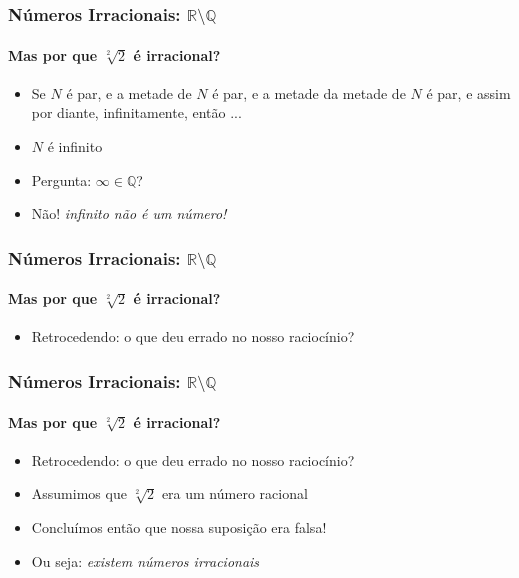 \documentclass[usenames,dvipsnames,svgnames]{beamer}
\begin{document}
\begin{frame}
	
	\frametitle{Números Irracionais: $\mathbb{R} \setminus \mathbb{Q}$}
	\framesubtitle{Mas {\color{red}por que} $\sqrt[2]{2}$ é irracional?}

	\begin{itemize}
		\item Se $N$ é par, e a metade de $N$ é par, e a metade da metade de $N$ é par, e assim por diante, infinitamente, então ...
		\item $N$ é {\color{red} infinito}
		\item Pergunta: $\infty \in \mathbb{Q}$?
		\item {\color{red} Não! \emph{infinito não é um número!}}
	\end{itemize}

\end{frame}

\begin{frame}
	
	\frametitle{Números Irracionais: $\mathbb{R} \setminus \mathbb{Q}$}
	\framesubtitle{Mas {\color{red}por que} $\sqrt[2]{2}$ é irracional?}

	\begin{itemize}
		\item Retrocedendo: o que deu errado no nosso raciocínio?
	\end{itemize}

\end{frame}

\begin{frame}
	
	\frametitle{Números Irracionais: $\mathbb{R} \setminus \mathbb{Q}$}
	\framesubtitle{Mas {\color{red}por que} $\sqrt[2]{2}$ é irracional?}

	\begin{itemize}
		\item Retrocedendo: o que deu errado no nosso raciocínio?
		\item Assumimos que $\sqrt[2]{2}$ era um número racional
		\item Concluímos então que nossa suposição era falsa!
		\item Ou seja: \emph{existem números irracionais}
	\end{itemize}

\end{frame}
\end{document}
